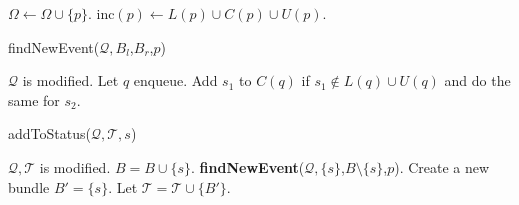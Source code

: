 \documentclass[a4paper]{article}
\begin{document}
\begin{algorithm}[htbp]
\begin{algorithmic}[1]
      \STATE
      \STATE $\Omega \leftarrow \Omega \cup \{p\}$. 
      \STATE $\text{inc}(p) \leftarrow L(p) \cup C(p) \cup U(p)$. 
      \ENDIF
     
    \ENDWHILE
    
  \end{algorithmic}
\end{algorithm}

\begin{algorithm}[htbp]
  \caption{findNewEvent($\mathcal{Q},B_l$,$B_r$,$p$)}
  \label{alg:fne}
  \begin{algorithmic}[1]
    \renewcommand{\algorithmicensure}{\textbf{Side effect : }}
    \ENSURE $\mathcal{Q}$ is modified.
    \STATE Let $q$ enqueue. 
    \STATE Add $s_1$ to $C(q)$ if $s_1 \notin L(q) \cup U(q)$
    and do the same for $s_2$. 
    \ENDIF
    \ENDFOR
    \ENDFOR
  \end{algorithmic}
\end{algorithm}

    

\begin{algorithm}[htbp]
  \caption{addToStatus($\mathcal{Q},\mathcal{T},s$)}
  \begin{algorithmic}[1]
    \renewcommand{\algorithmicensure}{\textbf{Side effect : }}
    \ENSURE $\mathcal{Q}, \mathcal{T}$ is modified.
    \STATE $B = B \cup \{s\}$. 
    \STATE \textbf{findNewEvent}($\mathcal{Q},\{s\}$,$B \setminus \{s\}$,$p$). 
    \ELSE
    \STATE Create a new bundle $B' = \{s\}$.
    Let $\mathcal{T} = \mathcal{T} \cup \{B'\}$.
    \ENDIF
  \end{algorithmic}
  \label{alg:ats}
\end{algorithm}
\end{document}
